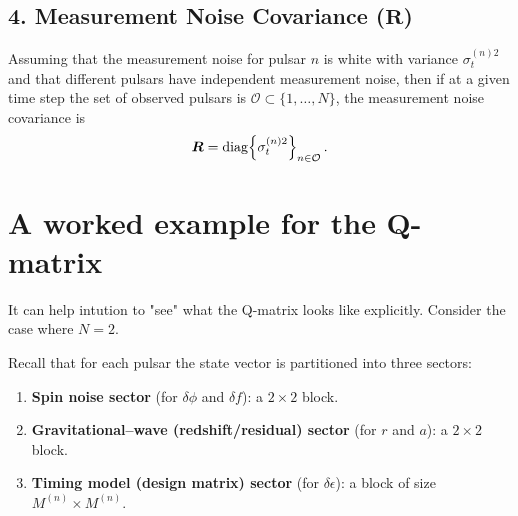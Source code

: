 \documentclass{tufte-handout} %
\begin{document}
	\subsection*{4. Measurement Noise Covariance (\(\boldsymbol{R}\))}
	
	Assuming that the measurement noise for pulsar $n$ is white with variance $\sigma_t^{(n)2}$ and that different pulsars have independent measurement noise, then if at a given time step the set of observed pulsars is $\mathcal{O}\subset\{1,\ldots,N\}$, the measurement noise covariance is
	\begin{equation}
		\boldsymbol{R} = \mathrm{diag}\Bigl\{\sigma_t^{(n)2}\Bigr\}_{n\in\mathcal{O}}\,.
	\end{equation}


	
%
%
%
%
%


\newpage
\appendix
\section{A worked example for the Q-matrix}


It can help intution to "see" what the Q-matrix looks like explicitly. Consider the case where $N=2$. \newline 



	Recall that for each pulsar the state vector is partitioned into three sectors:
	\begin{enumerate}
		\item \textbf{Spin noise sector} (for \(\delta\phi\) and \(\delta f\)): a \(2\times2\) block.
		\item \textbf{Gravitational--wave (redshift/residual) sector} (for \(r\) and \(a\)): a \(2\times2\) block.
		\item \textbf{Timing model (design matrix) sector} (for \(\delta\epsilon\)): a block of size \(M^{(n)}\times M^{(n)}\).
	\end{enumerate}
	
\end{document}
